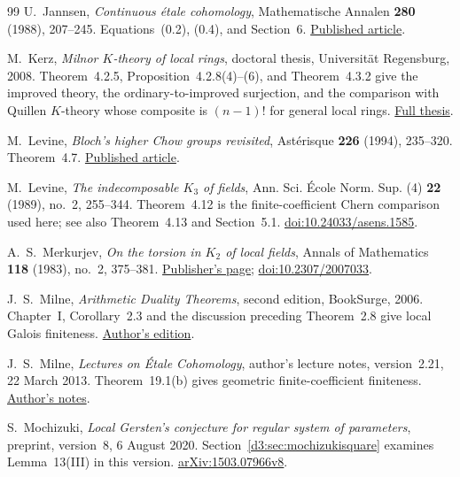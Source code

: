 \documentclass[11pt,a4paper]{amsart}
\numberwithin{equation}{section}
\theoremstyle{definition}
\theoremstyle{remark}
\begin{document}
\begin{thebibliography}{99}
U.~Jannsen, \emph{Continuous \'etale cohomology}, Mathematische Annalen \textbf{280} (1988), 207--245. Equations~(0.2), (0.4), and Section~6.
\href{https://epub.uni-regensburg.de/26684/1/jannsen12.pdf}{Published article}.

M.~Kerz, \emph{Milnor $K$-theory of local rings}, doctoral thesis, Universit\"at Regensburg, 2008. Theorem~4.2.5, Proposition~4.2.8(4)--(6), and Theorem~4.3.2 give the improved theory, the ordinary-to-improved surjection, and the comparison with Quillen $K$-theory whose composite is $(n-1)!$ for general local rings.
\href{https://d-nb.info/98935329x/34}{Full thesis}.

M.~Levine,
\emph{Bloch's higher Chow groups revisited},
Ast\'erisque \textbf{226} (1994), 235--320. Theorem~4.7.
\href{https://www.numdam.org/item/AST_1994__226__235_0/}{Published article}.

M.~Levine, \emph{The indecomposable $K_3$ of fields}, Ann. Sci. \'Ecole Norm. Sup. (4) \textbf{22} (1989), no.~2, 255--344. Theorem~4.12 is the finite-coefficient Chern comparison used here; see also Theorem~4.13 and Section~5.1.
\href{https://doi.org/10.24033/asens.1585}{doi:10.24033/asens.1585}.

A.~S.~Merkurjev, \emph{On the torsion in $K_2$ of local fields}, Annals of Mathematics \textbf{118} (1983), no.~2, 375--381.
\href{https://annals.math.princeton.edu/1983/118-2/p06}{Publisher's page};
\href{https://doi.org/10.2307/2007033}{doi:10.2307/2007033}.

J.~S.~Milne, \emph{Arithmetic Duality Theorems}, second edition, BookSurge, 2006. Chapter~I, Corollary~2.3 and the discussion preceding Theorem~2.8 give local Galois finiteness.
\href{https://www.jmilne.org/math/Books/ADTnot.pdf}{Author's edition}.

J.~S.~Milne, \emph{Lectures on \'Etale Cohomology}, author's lecture notes, version~2.21, 22 March 2013. Theorem~19.1(b) gives geometric finite-coefficient finiteness.
\href{https://www.jmilne.org/math/CourseNotes/LEC.pdf}{Author's notes}.

S.~Mochizuki, \emph{Local Gersten's conjecture for regular system of parameters}, preprint, version~8, 6 August 2020. Section~\ref{d3:sec:mochizukisquare} examines Lemma~13(III) in this version.
\href{https://arxiv.org/abs/1503.07966v8}{arXiv:1503.07966v8}.


\end{thebibliography}
\end{document}
